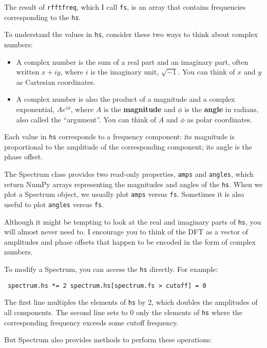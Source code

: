 \documentclass[12pt]{book} \usepackage[width=5.5in,height=8.5in, hmarginratio=3:2,vmarginratio=1:1]{geometry}
\begin{document}
The result of {\tt rfftfreq}, which I call {\tt fs}, is an array that contains frequencies corresponding to the {\tt hs}. 

To understand the values in {\tt hs}, consider these two ways to think about complex numbers: 

\begin{itemize} 

\item A complex number is the sum of a real part and an imaginary part, often written $x + iy$, where $i$ is the imaginary unit, $\sqrt{-1}$. You can think of $x$ and $y$ as Cartesian coordinates. 

\item A complex number is also the product of a magnitude and a complex exponential, $A e^{i \phi}$, where $A$ is the {\bf magnitude} and $\phi$ is the {\bf angle} in radians, also called the ``argument''. You can think of $A$ and $\phi$ as polar coordinates. 

\end{itemize} 

Each value in {\tt hs} corresponds to a frequency component: its magnitude is proportional to the amplitude of the corresponding component; its angle is the phase offset. 

The Spectrum class provides two read-only properties, {\tt amps} and {\tt angles}, which return NumPy arrays representing the magnitudes and angles of the {\tt hs}. When we plot a Spectrum object, we usually plot {\tt amps} versus {\tt fs}. Sometimes it is also useful to plot {\tt angles} versus {\tt fs}. 

Although it might be tempting to look at the real and imaginary parts of {\tt hs}, you will almost never need to. I encourage you to think of the DFT as a vector of amplitudes and phase offsets that happen to be encoded in the form of complex numbers. 

To modify a Spectrum, you can access the {\tt hs} directly. For example: 

\begin{verbatim} spectrum.hs *= 2 spectrum.hs[spectrum.fs > cutoff] = 0 \end{verbatim} 

The first line multiples the elements of {\tt hs} by 2, which doubles the amplitudes of all components. The second line sets to 0 only the elements of {\tt hs} where the corresponding frequency exceeds some cutoff frequency. 

But Spectrum also provides methods to perform these operations: 
\end{document}
